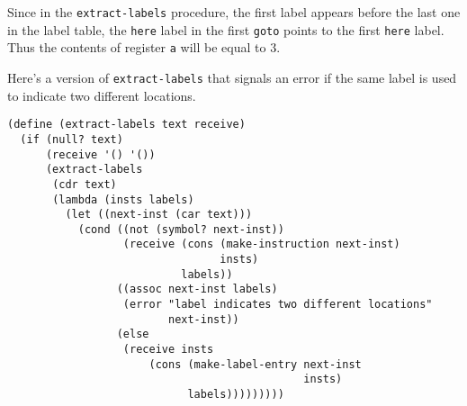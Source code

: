 \documentclass[a4paper,12pt]{article}
\begin{document}
Since in the \lstinline!extract-labels! procedure, the first label
appears before the last one in the label table, the \lstinline!here!
label in the first \lstinline!goto! points to the first
\lstinline!here! label.  Thus the contents of register \lstinline!a!
will be equal to $3$.

Here's a version of \lstinline!extract-labels! that signals an error
if the same label is used  to indicate two different locations.

\begin{lstlisting}
(define (extract-labels text receive)
  (if (null? text)
      (receive '() '())
      (extract-labels
       (cdr text)
       (lambda (insts labels)
         (let ((next-inst (car text)))
           (cond ((not (symbol? next-inst))
                  (receive (cons (make-instruction next-inst)
                                 insts)
                           labels))
                 ((assoc next-inst labels)
                  (error "label indicates two different locations"
                         next-inst))
                 (else
                  (receive insts
                      (cons (make-label-entry next-inst
                                              insts)
                            labels)))))))))
\end{lstlisting}
\end{document}
